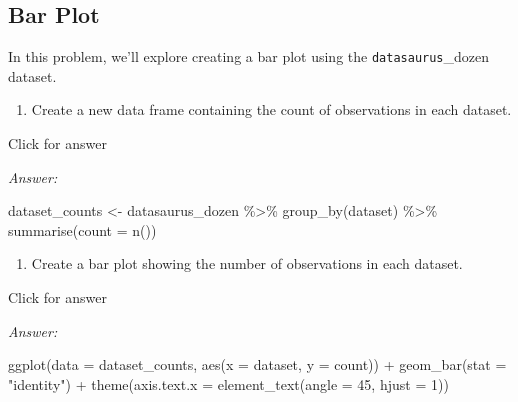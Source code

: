 \documentclass[
]{book}
\newenvironment{Shaded}{\begin{snugshade}}{\end{snugshade}}
\newcommand{\AttributeTok}[1]{\textcolor[rgb]{0.77,0.63,0.00}{#1}}
\newcommand{\DecValTok}[1]{\textcolor[rgb]{0.00,0.00,0.81}{#1}}
\newcommand{\FunctionTok}[1]{\textcolor[rgb]{0.00,0.00,0.00}{#1}}
\newcommand{\NormalTok}[1]{#1}
\newcommand{\OtherTok}[1]{\textcolor[rgb]{0.56,0.35,0.01}{#1}}
\newcommand{\SpecialCharTok}[1]{\textcolor[rgb]{0.00,0.00,0.00}{#1}}
\newcommand{\StringTok}[1]{\textcolor[rgb]{0.31,0.60,0.02}{#1}}
\providecommand{\tightlist}{%
  \setlength{\itemsep}{0pt}\setlength{\parskip}{0pt}}
\begin{document}
\hypertarget{bar-plot}{%
\subsection{Bar Plot}\label{bar-plot}}

In this problem, we'll explore creating a bar plot using the \texttt{datasaurus}\_dozen dataset.

\begin{enumerate}
\def\labelenumi{\alph{enumi}.}
\tightlist
\item
  Create a new data frame containing the count of observations in each dataset.
\end{enumerate}

Click for answer

\emph{Answer:}

\begin{Shaded}
\begin{Highlighting}[]
\NormalTok{dataset\_counts }\OtherTok{\textless{}{-}}\NormalTok{ datasaurus\_dozen }\SpecialCharTok{\%\textgreater{}\%}
  \FunctionTok{group\_by}\NormalTok{(dataset) }\SpecialCharTok{\%\textgreater{}\%}
  \FunctionTok{summarise}\NormalTok{(}\AttributeTok{count =} \FunctionTok{n}\NormalTok{())}
\end{Highlighting}
\end{Shaded}

\begin{enumerate}
\def\labelenumi{\alph{enumi}.}
\setcounter{enumi}{1}
\tightlist
\item
  Create a bar plot showing the number of observations in each dataset.
\end{enumerate}

Click for answer

\emph{Answer:}

\begin{Shaded}
\begin{Highlighting}[]
\FunctionTok{ggplot}\NormalTok{(}\AttributeTok{data =}\NormalTok{ dataset\_counts, }\FunctionTok{aes}\NormalTok{(}\AttributeTok{x =}\NormalTok{ dataset, }\AttributeTok{y =}\NormalTok{ count)) }\SpecialCharTok{+}
  \FunctionTok{geom\_bar}\NormalTok{(}\AttributeTok{stat =} \StringTok{"identity"}\NormalTok{) }\SpecialCharTok{+}
  \FunctionTok{theme}\NormalTok{(}\AttributeTok{axis.text.x =} \FunctionTok{element\_text}\NormalTok{(}\AttributeTok{angle =} \DecValTok{45}\NormalTok{, }\AttributeTok{hjust =} \DecValTok{1}\NormalTok{)) }
\end{Highlighting}
\end{Shaded}
\end{document}
